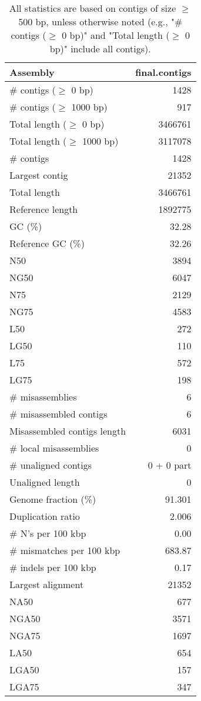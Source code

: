 \documentclass[12pt,a4paper]{article}
\begin{document}
\begin{table}[ht]
\begin{center}
\caption{All statistics are based on contigs of size $\geq$ 500 bp, unless otherwise noted (e.g., "\# contigs ($\geq$ 0 bp)" and "Total length ($\geq$ 0 bp)" include all contigs).}
\begin{tabular}{|l*{1}{|r}|}
\hline
Assembly & final.contigs \\ \hline
\# contigs ($\geq$ 0 bp) & 1428 \\ \hline
\# contigs ($\geq$ 1000 bp) & 917 \\ \hline
Total length ($\geq$ 0 bp) & 3466761 \\ \hline
Total length ($\geq$ 1000 bp) & 3117078 \\ \hline
\# contigs & 1428 \\ \hline
Largest contig & 21352 \\ \hline
Total length & 3466761 \\ \hline
Reference length & 1892775 \\ \hline
GC (\%) & 32.28 \\ \hline
Reference GC (\%) & 32.26 \\ \hline
N50 & 3894 \\ \hline
NG50 & 6047 \\ \hline
N75 & 2129 \\ \hline
NG75 & 4583 \\ \hline
L50 & 272 \\ \hline
LG50 & 110 \\ \hline
L75 & 572 \\ \hline
LG75 & 198 \\ \hline
\# misassemblies & 6 \\ \hline
\# misassembled contigs & 6 \\ \hline
Misassembled contigs length & 6031 \\ \hline
\# local misassemblies & 0 \\ \hline
\# unaligned contigs & 0 + 0 part \\ \hline
Unaligned length & 0 \\ \hline
Genome fraction (\%) & 91.301 \\ \hline
Duplication ratio & 2.006 \\ \hline
\# N's per 100 kbp & 0.00 \\ \hline
\# mismatches per 100 kbp & 683.87 \\ \hline
\# indels per 100 kbp & 0.17 \\ \hline
Largest alignment & 21352 \\ \hline
NA50 & 677 \\ \hline
NGA50 & 3571 \\ \hline
NGA75 & 1697 \\ \hline
LA50 & 654 \\ \hline
LGA50 & 157 \\ \hline
LGA75 & 347 \\ \hline
\end{tabular}
\end{center}
\end{table}
\end{document}
